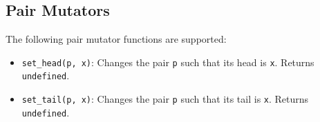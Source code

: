 \subsection*{Pair Mutators}

The following pair mutator functions are supported:

\begin{itemize}
\item \lstinline{set_head(p, x)}: Changes the pair \lstinline{p} such that its head is \lstinline{x}.
Returns \lstinline{undefined}.
\item \lstinline{set_tail(p, x)}: Changes the pair \lstinline{p} such that its tail is \lstinline{x}.
Returns \lstinline{undefined}.
\end{itemize}

  


